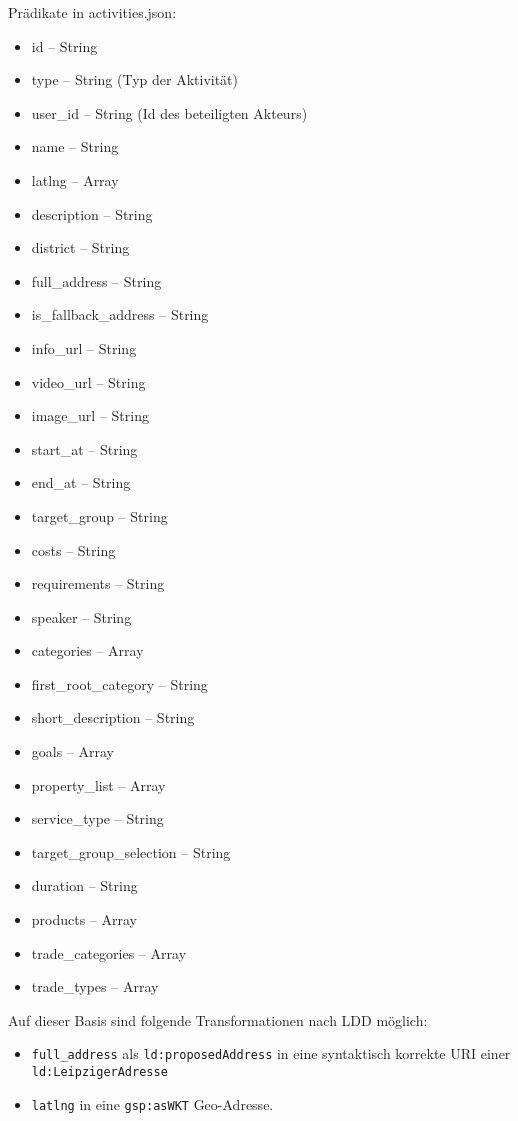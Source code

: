 \documentclass[a4paper,11pt]{article}
\begin{document}
Prädikate in activities.json:
\begin{itemize}\itemsep0pt
  \item id -- String
  \item type -- String (Typ der Aktivität)
  \item user\_id -- String (Id des beteiligten Akteurs)
  \item name -- String
  \item latlng -- Array
  \item description -- String
  \item district -- String
  \item full\_address -- String
  \item is\_fallback\_address -- String
  \item info\_url -- String
  \item video\_url -- String
  \item image\_url -- String
  \item start\_at -- String
  \item end\_at -- String
  \item target\_group -- String
  \item costs -- String
  \item requirements -- String
  \item speaker -- String
  \item categories -- Array
  \item first\_root\_category -- String
  \item short\_description -- String
  \item goals -- Array
  \item property\_list -- Array
  \item service\_type -- String
  \item target\_group\_selection -- String
  \item duration -- String
  \item products -- Array
  \item trade\_categories -- Array
  \item trade\_types -- Array
\end{itemize}

Auf dieser Basis sind folgende Transformationen nach LDD möglich:
\begin{itemize}\raggedright
\item \texttt{full\_address} als \texttt{ld:proposedAddress} in eine
  syntaktisch korrekte URI einer \texttt{ld:LeipzigerAdresse}
\item \texttt{latlng} in eine \texttt{gsp:asWKT} Geo-Adresse.
\end{itemize}
\end{document}
